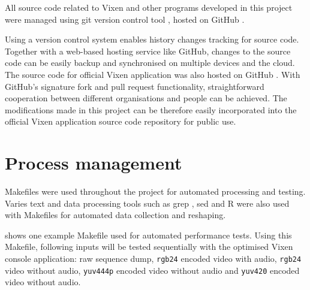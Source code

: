 All source code related to Vixen and other programs developed in this project were managed using git version control tool \cite{git}, hosted on GitHub \cite{github} \cite{github_vixen_yz} \cite{github_project}.

Using a version control system enables history changes tracking for source code. Together with a web-based hosting service like GitHub, changes to the source code can be easily backup and synchronised on multiple devices and the cloud. The source code for official Vixen application was also hosted on GitHub \cite{github_vixen}. With GitHub's signature fork and pull request functionality, straightforward cooperation between different organisations and people can be achieved. The modifications made in this project can be therefore easily incorporated into the official Vixen application source code repository for public use.

\section{Process management}

Makefiles \cite{make} were used throughout the project for automated processing and testing. Varies text and data processing tools such as grep \cite{grep}, sed \cite{sed} and R \cite{r_project} were also used with Makefiles for automated data collection and reshaping.

 shows one example Makefile used for automated performance tests. Using this Makefile, following inputs will be tested sequentially with the optimised Vixen console application: raw sequence dump, \texttt{rgb24} encoded video with audio, \texttt{rgb24} video without audio, \texttt{yuv444p} encoded video without audio and \texttt{yuv420} encoded video without audio.
